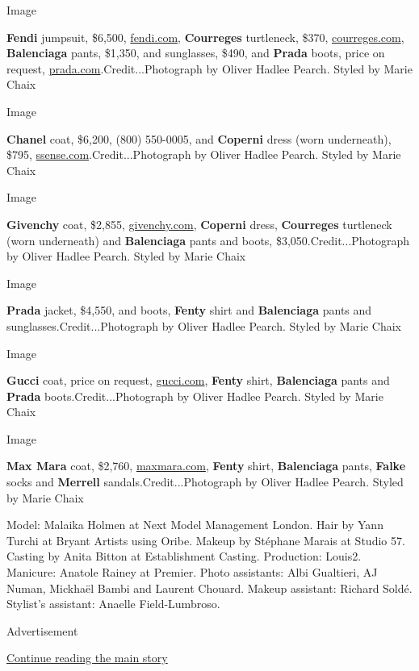 Image

\textbf{Fendi} jumpsuit, \$6,500,
\href{https://www.fendi.com/}{fendi.com}, \textbf{Courreges} turtleneck,
\$370, \href{https://courreges.com}{courreges.com}, \textbf{Balenciaga}
pants, \$1,350, and sunglasses, \$490, and \textbf{Prada} boots, price
on request, \href{https://prada.com}{prada.com}.Credit...Photograph by
Oliver Hadlee Pearch. Styled by Marie Chaix

Image

\textbf{Chanel} coat, \$6,200, (800) 550-0005, and \textbf{Coperni}
dress (worn underneath), \$795,
\href{https://ssense.com}{ssense.com}.Credit...Photograph by Oliver
Hadlee Pearch. Styled by Marie Chaix

Image

\textbf{Givenchy} coat, \$2,855,
\href{https://www.givenchy.com}{givenchy.com}, \textbf{Coperni} dress,
\textbf{Courreges} turtleneck (worn underneath) and \textbf{Balenciaga}
pants and boots, \$3,050.Credit...Photograph by Oliver Hadlee Pearch.
Styled by Marie Chaix

Image

\textbf{Prada} jacket, \$4,550, and boots, \textbf{Fenty} shirt and
\textbf{Balenciaga} pants and sunglasses.Credit...Photograph by Oliver
Hadlee Pearch. Styled by Marie Chaix

Image

\textbf{Gucci} coat, price on request,
\href{https://www.gucci.com}{gucci.com}, \textbf{Fenty} shirt,
\textbf{Balenciaga} pants and \textbf{Prada} boots.Credit...Photograph
by Oliver Hadlee Pearch. Styled by Marie Chaix

Image

\textbf{Max Mara} coat, \$2,760,
\href{https://maxmara.com}{maxmara.com}, \textbf{Fenty} shirt,
\textbf{Balenciaga} pants, \textbf{Falke} socks and \textbf{Merrell}
sandals.Credit...Photograph by Oliver Hadlee Pearch. Styled by Marie
Chaix

Model: Malaika Holmen at Next Model Management London. Hair by Yann
Turchi at Bryant Artists using Oribe. Makeup by Stéphane Marais at
Studio 57. Casting by Anita Bitton at Establishment Casting. Production:
Louis2. Manicure: Anatole Rainey at Premier. Photo assistants: Albi
Gualtieri, AJ Numan, Mickhaël Bambi and Laurent Chouard. Makeup
assistant: Richard Soldé. Stylist's assistant: Anaelle Field-Lumbroso.

Advertisement

\protect\hyperlink{after-bottom}{Continue reading the main story}


